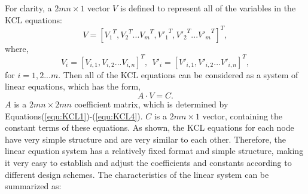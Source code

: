 For clarity, a ${2mn\times 1}$ vector ${V}$ is defined to represent all of the variables in the KCL equations:
\begin{equation}\label{equ:V1}
{V}=[{V_1}^T,{V_2}^T...{V_m}^T,{V'_1}^T,{V'_2}^T...{V'_m}^T]^T,
\end{equation}
where,
\begin{equation}\label{equ:V2}
{V_i} = [V_{i,1},V_{i,2}...V_{i,n}]^T,~~{V'_i} = [V'_{i,1},V'_{i,2}...V'_{i,n}]^T,
\end{equation}
for $i=1,2...m$. Then all of the KCL equations can be considered as a system of linear equations, which has the form,
\begin{equation}\label{equ:matrix}
A\cdot V = C.
\end{equation}
$A$ is a ${2mn\times{2mn}}$ coefficient matrix, which is determined by Equations(\ref{equ:KCL1})-(\ref{equ:KCL4}). $C$ is a ${2mn\times{1}}$ vector, containing the constant terms of these equations. As shown, the KCL equations for each node have very simple structure and are very similar to each other. Therefore, the linear equation system has a relatively fixed format and simple structure, making it very easy to establish and adjust the coefficients and constants according to different design schemes. The characteristics of the linear system can be summarized as:


